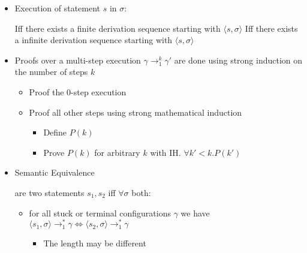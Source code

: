 \begin{itemize}
\begin{itemize}
\begin{itemize}
\begin{itemize}
                        \end{itemize}
                \end{itemize}
                \begin{itemize}
                    \item Execution of statement $s$ in $\sigma$:
                        \begin{itemize}
                             Iff there exists a finite derivation sequence starting with $\langle s, \sigma \rangle$
                             Iff there exists a infinite derivation sequence starting with $\langle s, \sigma \rangle$
                        \end{itemize}
                \end{itemize}
        \end{itemize}
        \begin{itemize}
            \item Proofs over a multi-step execution $\gamma \to_1^k \gamma'$ are done using strong induction on the number of steps $k$
                \begin{itemize}
                    \item Proof the $0$-step execution
                    \item Proof all other steps using strong mathematical induction
                        \begin{itemize}
                            \item Define $P(k)$
                            \item Prove $P(k)$ for arbitrary $k$ with IH. $\forall k' < k. P(k')$
                        \end{itemize}
                \end{itemize}
            \item Semantic Equivalence
                \begin{itemize}
                     are two statements $s_1, s_2$ iff $\forall \sigma$ both:
                        \begin{itemize}
                            \item for all stuck or terminal configurations $\gamma$ we have $\langle s_1, \sigma \rangle \to_1^* \gamma \iff \langle s_2, \sigma \rangle \to_1^* \gamma$
                                \begin{itemize}
                                    \item The length may be different

\end{itemize}
\end{itemize}
\end{itemize}
\end{itemize}
\end{itemize}

